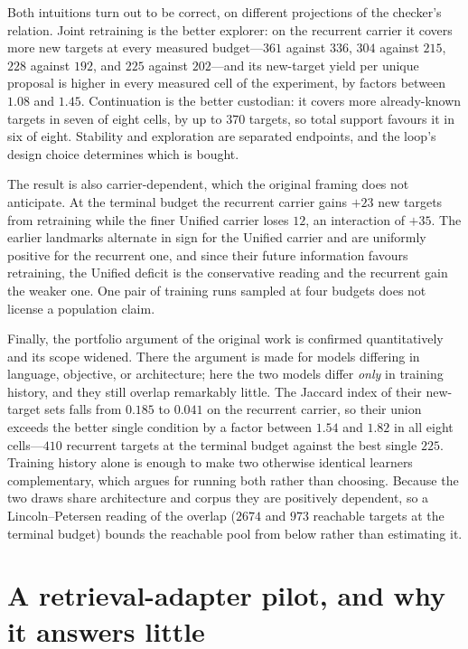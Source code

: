 \documentclass[11pt]{article}
\begin{document}
Both intuitions turn out to be correct, on different projections of the checker's relation.
Joint retraining is the better explorer: on the recurrent carrier it covers more new targets
at every measured budget---$361$ against $336$, $304$ against $215$, $228$ against $192$,
and $225$ against $202$---and its new-target yield per unique proposal is higher in every
measured cell of the experiment, by factors between $1.08$ and $1.45$.  Continuation is the
better custodian: it covers more already-known targets in seven of eight cells, by up to
$370$ targets, so total support favours it in six of eight.  Stability and exploration are
separated endpoints, and the loop's design choice determines which is bought.

The result is also carrier-dependent, which the original framing does not anticipate.  At the
terminal budget the recurrent carrier gains $+23$ new targets from retraining while the finer
Unified carrier loses $12$, an interaction of $+35$.  The earlier landmarks alternate in sign
for the Unified carrier and are uniformly positive for the recurrent one, and since their
future information favours retraining, the Unified deficit is the conservative reading and the
recurrent gain the weaker one.  One pair of training runs sampled at four budgets does not
license a population claim.

Finally, the portfolio argument of the original work is confirmed quantitatively and its
scope widened.  There the argument is made for models differing in language, objective, or
architecture; here the two models differ \emph{only} in training history, and they still
overlap remarkably little.  The Jaccard index of their new-target sets falls from $0.185$ to
$0.041$ on the recurrent carrier, so their union exceeds the better single condition by a
factor between $1.54$ and $1.82$ in all eight cells---$410$ recurrent targets at the terminal
budget against the best single $225$.  Training history alone is enough to make two otherwise
identical learners complementary, which argues for running both rather than choosing.  Because
the two draws share architecture and corpus they are positively dependent, so a
Lincoln--Petersen reading of the overlap ($2674$ and $973$ reachable targets at the terminal
budget) bounds the reachable pool from below rather than estimating it.

\section{A retrieval-adapter pilot, and why it answers little}
\label{sec:adapter-pilot}
\end{document}
